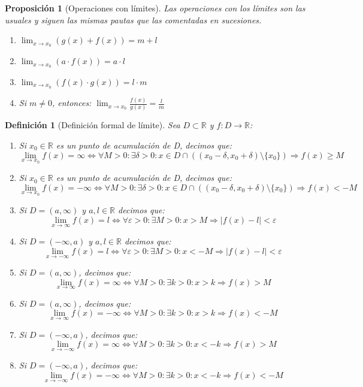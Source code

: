 \documentclass[10pt,a4paper,openright]{book}
\newtheorem{proposicion}{Proposición}[chapter]
\newtheorem{definicion}{Definición}[chapter]
\begin{document}
\begin{proposicion}[Operaciones con límites]
Las operaciones con los límites son las usuales y siguen las mismas pautas que las comentadas en sucesiones.
\begin{enumerate}
\item $\lim_{x\rightarrow x_0}(g(x)+f(x))=m+l$
\item $\lim_{x\rightarrow x_0}(a\cdot f(x))=a\cdot l$
\item $\lim_{x\rightarrow x_0}(f(x)\cdot g(x))=l\cdot m$
\item Si $m\neq 0$, entonces: $\lim_{x\rightarrow x_0}\frac{f(x)}{g(x)}=\frac{l}{m}$
\end{enumerate}
\end{proposicion}

\begin{definicion}[Definición formal de límite]
Sea $D\subset \mathbb R$ y $f: D\longrightarrow \mathbb R$:
\begin{enumerate}
\item Si $x_0\in \mathbb R$ es un punto de acumulación de D, decimos que:
$$\lim_{x\rightarrow x_0}f(x)=\infty\Leftrightarrow\forall M>0: \exists \delta>0: x\in D\cap \left((x_0-\delta, x_0+\delta)\mbox{\textbackslash}\{x_0\}\right)\Rightarrow f(x)\geq M$$

\item Si $x_0\in \mathbb R$ es un punto de acumulación de D, decimos que:
$$\lim_{x\rightarrow x_0}f(x)=-\infty \Leftrightarrow\forall M>0: \exists \delta>0: x\in D\cap \left((x_0-\delta, x_0+\delta)\mbox{\textbackslash}\{x_0\}\right)\Rightarrow f(x)<-M$$

\item Si $D=(a, \infty)$ y $a,l\in \mathbb R$ decimos que:
$$\lim_{x\rightarrow \infty}f(x)=l\Leftrightarrow \forall \varepsilon>0: \exists M>0: x>M\Rightarrow |f(x)-l|<\varepsilon$$

\item Si $D=(-\infty, a)$ y $a,l\in \mathbb R$ decimos que:
$$\lim_{x\rightarrow -\infty}f(x)=l\Leftrightarrow \forall \varepsilon>0: \exists M>0: x< -M\Rightarrow |f(x)-l|<\varepsilon$$

\item Si $D=(a,\infty)$, decimos que:
$$\lim_{x\rightarrow \infty}f(x)=\infty \Leftrightarrow \forall M>0: \exists k>0:  x>k \Rightarrow f(x)>M$$

\item Si $D=(a,\infty)$, decimos que:
$$\lim_{x\rightarrow \infty}f(x)=-\infty \Leftrightarrow \forall M>0: \exists k>0:  x>k \Rightarrow f(x)<-M$$

\item Si $D=(-\infty,a)$, decimos que:
$$\lim_{x\rightarrow -\infty}f(x)=\infty \Leftrightarrow \forall M>0: \exists k>0:  x<-k \Rightarrow f(x)>M$$

\item Si $D=(-\infty,a)$, decimos que:
$$\lim_{x\rightarrow -\infty}f(x)=-\infty \Leftrightarrow \forall M>0: \exists k>0:  x<-k \Rightarrow f(x)<-M$$
\end{enumerate}
\end{definicion}
\end{document}
